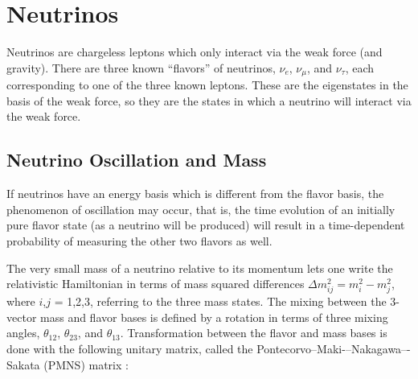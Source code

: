 \section{Neutrinos}

Neutrinos are chargeless leptons which only interact via the weak force (and gravity).  There are three known ``flavors'' of neutrinos, $\nu_{e}$, $\nu_{\mu}$, and $\nu_{\tau}$, each corresponding to one of the three known leptons.  These are the eigenstates in the basis of the weak force, so they are the states in which a neutrino will interact via the weak force.

\subsection{Neutrino Oscillation and Mass}

If neutrinos have an energy basis which is different from the flavor basis, the phenomenon of oscillation may occur, that is, the time evolution of an initially pure flavor state (as a neutrino will be produced) will result in a time-dependent probability of measuring the other two flavors as well.  

The very small mass of a neutrino relative to its momentum lets one write the relativistic Hamiltonian in terms of mass squared differences $\Delta m_{ij}^{2} = m_{i}^{2} - m_{j}^{2}$, where $i$,$j$ = 1,2,3, referring to the three mass states.  The mixing between the 3-vector mass and flavor bases is defined by a rotation in terms of three mixing angles, $\theta_{12}$, $\theta_{23}$, and $\theta_{13}$.  Transformation between the flavor and mass bases is done with the following unitary matrix, called the Pontecorvo--Maki-–Nakagawa–-Sakata (PMNS) matrix \cite{ReviewNuMass}:


